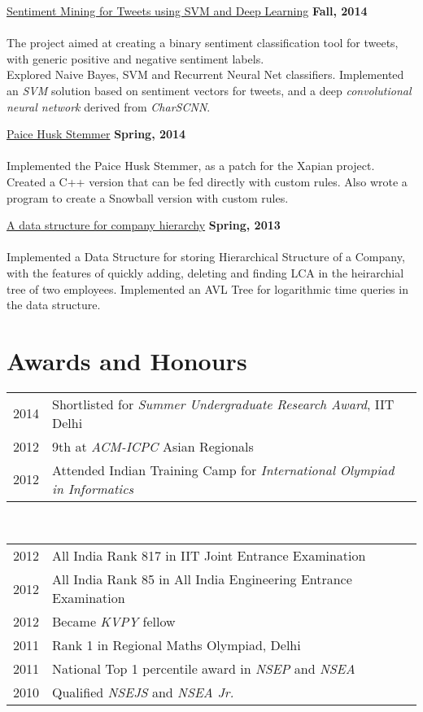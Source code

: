 \documentclass[margin,line]{res}
\begin{document}
\begin{resume}
\underline{\sc Sentiment Mining for Tweets using SVM and Deep Learning} \hfill {\bf Fall, 2014}\\\\
The project aimed at creating a binary sentiment classification tool for tweets, with generic positive and negative sentiment labels. \\Explored Naive Bayes, SVM and Recurrent Neural Net classifiers. Implemented an \emph{SVM} solution based on sentiment vectors for tweets, and a deep \emph{convolutional neural network} derived from \emph{CharSCNN}.

\underline{\sc Paice Husk Stemmer} \hfill {\bf Spring, 2014}\\\\
Implemented the Paice Husk Stemmer, as a patch for the Xapian project. Created a C++ version that can be fed directly with custom rules. Also wrote a program to create a Snowball version with custom rules.

\underline{\sc A data structure for company hierarchy} \hfill {\bf Spring, 2013}\\\\
Implemented a Data Structure for storing Hierarchical Structure of a Company, with the features of quickly adding, deleting and finding LCA in the heirarchial tree of two employees. Implemented an AVL Tree for logarithmic time queries in the data structure.

\section{\sc Awards and Honours}

\begin{tabular}{rl}
2014 & Shortlisted for {\em Summer Undergraduate Research Award}, IIT Delhi\\
2012 & 9th at {\em ACM-ICPC} Asian Regionals\\
2012 & Attended Indian Training Camp for {\em International Olympiad in Informatics}\\
\end{tabular}\\
\begin{tabular}{rl}
2012 & All India Rank 817 in IIT Joint Entrance Examination\\
2012 & All India Rank 85 in All India Engineering Entrance Examination\\
2012 & Became {\em KVPY} fellow\\
2011 & Rank 1 in Regional Maths Olympiad, Delhi\\
2011 & National Top 1 percentile award in {\em NSEP} and {\em NSEA}\\
2010 & Qualified {\em NSEJS} and {\em NSEA Jr.}\\
\end{tabular}


\end{resume}
\end{document}
